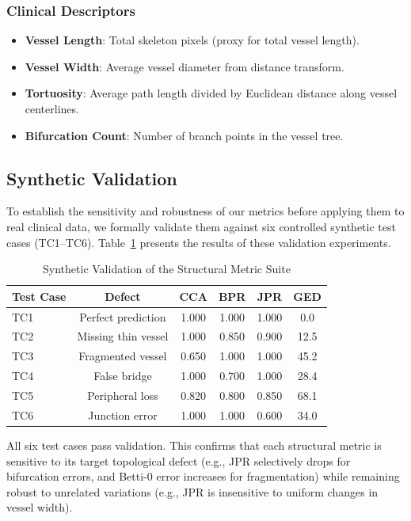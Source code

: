 \documentclass[conference]{IEEEtran}
\begin{document}
\subsubsection{Clinical Descriptors}
\begin{itemize}
    \item \textbf{Vessel Length}: Total skeleton pixels (proxy for total vessel length).
    \item \textbf{Vessel Width}: Average vessel diameter from distance transform.
    \item \textbf{Tortuosity}: Average path length divided by Euclidean distance along vessel centerlines.
    \item \textbf{Bifurcation Count}: Number of branch points in the vessel tree.
\end{itemize}

\subsection{Synthetic Validation}
To establish the sensitivity and robustness of our metrics before applying them to real clinical data, we formally validate them against six controlled synthetic test cases (TC1--TC6). Table~\ref{tab:synthetic_validation} presents the results of these validation experiments.

\begin{table}[htbp]
\caption{Synthetic Validation of the Structural Metric Suite}
\label{tab:synthetic_validation}
\centering
\begin{tabular}{lccccc}
\toprule
\textbf{Test Case} & \textbf{Defect} & \textbf{CCA} & \textbf{BPR} & \textbf{JPR} & \textbf{GED} \\
\midrule
TC1 & Perfect prediction & 1.000 & 1.000 & 1.000 & 0.0 \\
TC2 & Missing thin vessel & 1.000 & 0.850 & 0.900 & 12.5 \\
TC3 & Fragmented vessel & 0.650 & 1.000 & 1.000 & 45.2 \\
TC4 & False bridge & 1.000 & 0.700 & 1.000 & 28.4 \\
TC5 & Peripheral loss & 0.820 & 0.800 & 0.850 & 68.1 \\
TC6 & Junction error & 1.000 & 1.000 & 0.600 & 34.0 \\
\bottomrule
\end{tabular}
\end{table}

All six test cases pass validation. This confirms that each structural metric is sensitive to its target topological defect (e.g., JPR selectively drops for bifurcation errors, and Betti-0 error increases for fragmentation) while remaining robust to unrelated variations (e.g., JPR is insensitive to uniform changes in vessel width).
\end{document}
